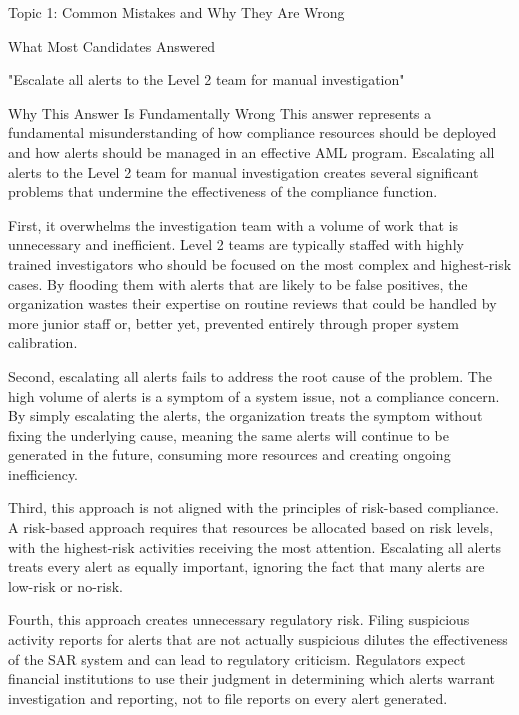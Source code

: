 \documentclass[8pt]{beamer}  %
\newcommand{\wrong}{\textcolor{errorred}{\ding{55}}}
\begin{document}
	\begin{frame}{Topic 1: Common Mistakes and Why They Are Wrong}
		\begin{block}{\large \wrong \textcolor{errorred}{What Most Candidates Answered}}
			\begin{center}
				\Large "Escalate all alerts to the Level 2 team for manual investigation"
			\end{center}
		\end{block}
		
		\vspace{0.2cm}
		\begin{block}{\large Why This Answer Is Fundamentally Wrong}
			This answer represents a fundamental misunderstanding of how compliance resources should be deployed and how alerts should be managed in an effective AML program. Escalating all alerts to the Level 2 team for manual investigation creates several significant problems that undermine the effectiveness of the compliance function.
			
			First, it overwhelms the investigation team with a volume of work that is unnecessary and inefficient. Level 2 teams are typically staffed with highly trained investigators who should be focused on the most complex and highest-risk cases. By flooding them with alerts that are likely to be false positives, the organization wastes their expertise on routine reviews that could be handled by more junior staff or, better yet, prevented entirely through proper system calibration.
			
			Second, escalating all alerts fails to address the root cause of the problem. The high volume of alerts is a symptom of a system issue, not a compliance concern. By simply escalating the alerts, the organization treats the symptom without fixing the underlying cause, meaning the same alerts will continue to be generated in the future, consuming more resources and creating ongoing inefficiency.
			
			Third, this approach is not aligned with the principles of risk-based compliance. A risk-based approach requires that resources be allocated based on risk levels, with the highest-risk activities receiving the most attention. Escalating all alerts treats every alert as equally important, ignoring the fact that many alerts are low-risk or no-risk.
			
			Fourth, this approach creates unnecessary regulatory risk. Filing suspicious activity reports for alerts that are not actually suspicious dilutes the effectiveness of the SAR system and can lead to regulatory criticism. Regulators expect financial institutions to use their judgment in determining which alerts warrant investigation and reporting, not to file reports on every alert generated.
			

\end{block}
\end{frame}
\end{document}
